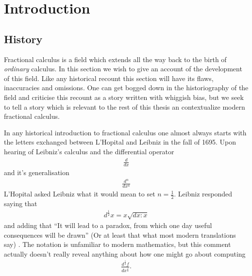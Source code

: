 \section{Introduction}
\subsection{History}
Fractional calculus is a field which extends all the way back to the birth of \emph{ordinary} calculus. In this section we wish to give an account of the development of this field. Like any historical recount this section will have its flaws, inaccuracies and omissions. One can get bogged down in the historiography of the field and criticise this recount as a story written with whiggish bias, but we seek to tell a story which is relevant to the rest of this thesis an contextualize modern fractional calculus.

In any historical introduction to fractional calculus one almost always starts with the letters exchanged between L'Hopital and Leibniz in the fall of 1695. Upon hearing of Leibniz's calculus and the differential operator
\begin{align}
    \frac{d}{dx}
\end{align}
and it's generalisation
\begin{align}
    \frac{d^n}{dx^n}
\end{align}
L'Hopital asked Leibniz what it would mean to set $ n = \frac{1}{2} $. Leibniz responded saying that 
\begin{align}
    d^\frac{1}{2}x = x\sqrt{dx:x}
\end{align} and adding that
``It will lead to a paradox, from which one day useful consequences will be drawn'' (Or at least that what most modern translations say) \cite{Abbas2012}. The notation is unfamiliar to modern mathematics, but this comment actually doesn't really reveal anything about how one might go about computing
\begin{align}
    \frac{d^\frac{1}{2}f}{dx^\frac{1}{2}}.
\end{align}

